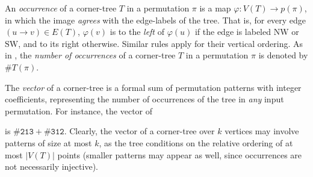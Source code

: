 \documentclass{article}
\newcommand{\pce}[1]{{\# \mathtt{#1} }}
\theoremstyle{remark}
\theoremstyle{plain}
\begin{document}
An \textit{occurrence} of a corner-tree $T$ in a permutation $\pi$ is a map $\varphi: V(T) \to p(\pi)$, in which the image \textit{agrees} with the edge-labels of the tree. That is, for every edge $(u \to v) \in E(T)$, $\varphi(v)$ is to the \textit{left} of $\varphi(u)$ if the edge is labeled $\text{NW}$ or $\text{SW}$, and to its right otherwise. Similar rules apply for their vertical ordering.
As in \cite{even2021counting}, the \textit{number of occurrences} of a corner-tree $T$ in a permutation $\pi$ is denoted by $\#T(\pi)$.

The \textit{vector} of a corner-tree is a formal sum of permutation patterns with integer coefficients, representing the number of occurrences of the tree in \textit{any} input permutation.
For instance, the vector of  is $\pce{213} + \pce{312}$. Clearly, the vector of a corner-tree over $k$ vertices may involve patterns of size at most $k$, as the tree conditions on the relative ordering of at most $|V(T)|$ points (smaller patterns may appear as well, since occurrences are not necessarily injective).
\end{document}
